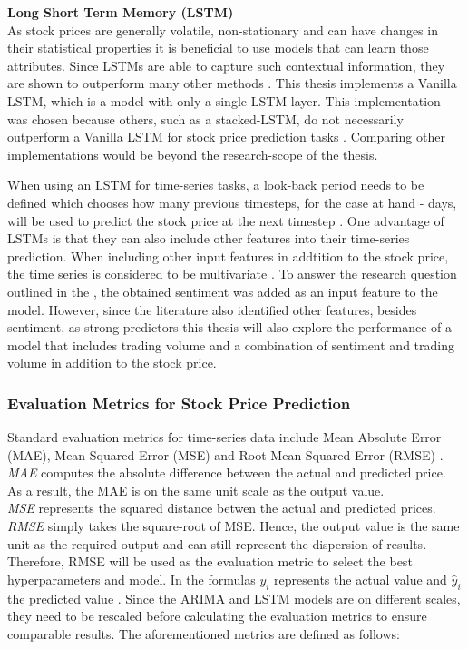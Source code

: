 \documentclass[11pt, a4paper]{article}
\begin{document}
\noindent\textbf{Long Short Term Memory (LSTM)}\\
As stock prices are generally volatile, non-stationary and can have changes in their statistical properties it is beneficial to use
models that can learn those attributes. Since LSTMs are able to capture such contextual information, they are shown to outperform many other methods \citep{preeti2019lstm}.
This thesis implements a Vanilla LSTM, which is a model with only a single LSTM layer. This implementation was chosen because others, such as a stacked-LSTM, do not necessarily outperform a Vanilla LSTM for stock price prediction tasks \citep{hai2020lstms}.
Comparing other implementations would be beyond the research-scope of the thesis.

When using an LSTM for time-series tasks, a look-back period needs to be defined which chooses how many previous timesteps, for the case at hand - days, will be used to predict the 
stock price at the next timestep \citep{lim2020lookback}.
One advantage of LSTMs is that they can also include other features into their time-series prediction.
When including other input features in addtition to the stock price, the time series is considered to be multivariate \citep{liu2019multivariate}.
To answer the research question outlined in the , the obtained sentiment was added as an input feature to the model. However, since the literature
also identified other features, besides sentiment, as strong predictors this thesis will also explore the performance of a model that includes trading volume
and a combination of sentiment and trading volume in addition to the stock price.\\

\subsubsection{Evaluation Metrics for Stock Price Prediction}
Standard evaluation metrics for time-series data include Mean Absolute Error (MAE), Mean Squared Error (MSE) and Root Mean Squared Error (RMSE) \citep{rezaei2021stockpriceprediction}.\\
\emph{MAE} computes the absolute difference between the actual and predicted price. As a result, the MAE is on the same unit scale as
the output value.\\
\emph{MSE} represents the squared distance betwen the actual and predicted prices. \\
\emph{RMSE} simply takes the square-root of MSE. Hence, the output value is the same unit as the required output and can still represent the
dispersion of results. Therefore, RMSE will be used as the evaluation metric to select the best hyperparameters and model.
In the formulas $y_{i}$ represents the actual value and $\hat{y}_i$ the predicted value \citep{chen2021meanvariance}.
Since the ARIMA and LSTM models are on different scales, they need to be rescaled before calculating the evaluation metrics to ensure comparable results.
The aforementioned metrics are defined as follows:
\end{document}
